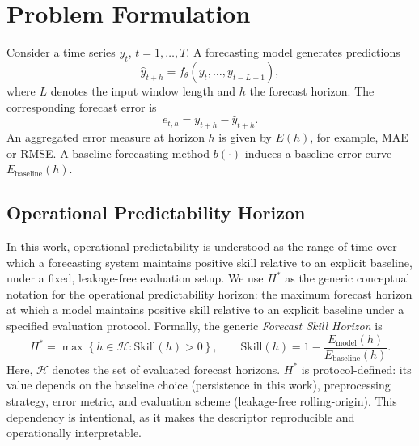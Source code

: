 \documentclass[pdflatex,sn-mathphys]{sn-jnl}
\begin{document}
\section{Problem Formulation}
Consider a time series $y_t$, $t = 1,\dots,T$.
A forecasting model generates predictions
\begin{equation}
\hat{y}_{t+h} = f_{\theta}(y_t, \dots, y_{t-L+1}),
\end{equation}
where $L$ denotes the input window length and $h$ the forecast horizon.
The corresponding forecast error is
\begin{equation}
e_{t,h} = y_{t+h} - \hat{y}_{t+h}.
\end{equation}
An aggregated error measure at horizon $h$ is given by $E(h)$, for
example, MAE or RMSE. A baseline forecasting method $b(\cdot)$ induces
a baseline error curve $E_{\mathrm{baseline}}(h)$.
\subsection{Operational Predictability Horizon}
In this work, operational predictability is understood as the range of time over which a forecasting system maintains positive skill relative to an explicit baseline, under a fixed, leakage-free evaluation setup.
We use $H^*$ as the generic conceptual notation for the operational predictability horizon: the maximum forecast horizon at which a model maintains positive skill relative to an explicit baseline under a specified evaluation protocol. Formally, the generic \emph{Forecast Skill Horizon} is
\begin{equation}
  H^* = \max \left\{ h \in \mathcal{H} : \mathrm{Skill}(h) > 0 \right\},
  \qquad
  \mathrm{Skill}(h) = 1 - \frac{E_{\mathrm{model}}(h)}{E_{\mathrm{baseline}}(h)}.
\end{equation}
Here, $\mathcal{H}$ denotes the set of evaluated forecast horizons. $H^*$ is protocol-defined: its value depends on the baseline choice (persistence in this work), preprocessing strategy, error metric, and evaluation scheme (leakage-free rolling-origin). This dependency is intentional, as it makes the descriptor reproducible and operationally interpretable.
\end{document}
